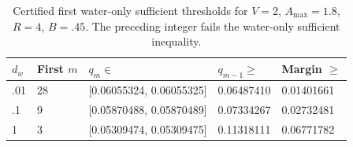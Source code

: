 \begin{table}[htbp]
\centering
\caption{Certified first water-only sufficient thresholds for $V=2$, $A_{\max}=1.8$, $R=4$, $B=.45$. The preceding integer fails the water-only sufficient inequality.}
\label{tab:water_thresholds}
\begin{tabular}{lllll}
\toprule
$d_w$ & First $m$ & $q_m\in$ & $q_{m-1}\geq$ & Margin $\geq$ \\
\midrule
.01 & 28 & [0.06055324, 0.06055325] & 0.06487410 & 0.01401661 \\
.1 & 9 & [0.05870488, 0.05870489] & 0.07334267 & 0.02732481 \\
1 & 3 & [0.05309474, 0.05309475] & 0.11318111 & 0.06771782 \\
\bottomrule
\end{tabular}
\end{table}
